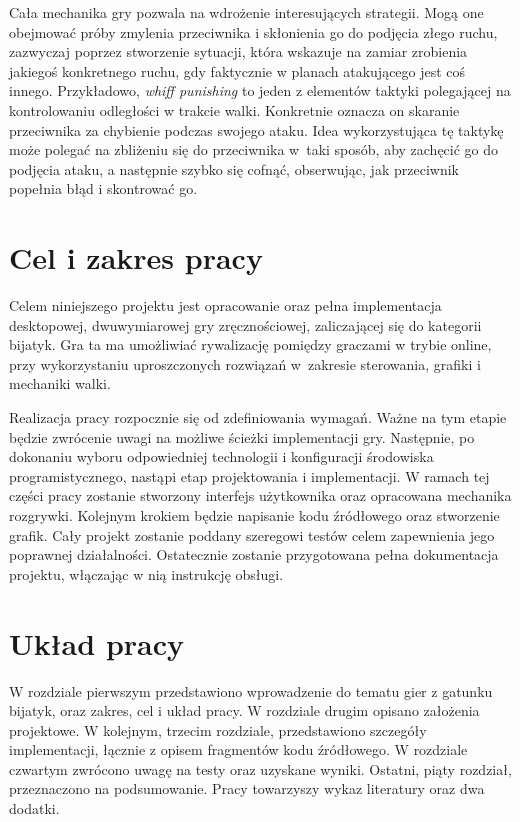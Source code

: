 Cała mechanika gry pozwala na wdrożenie interesujących strategii. Mogą one obejmować próby zmylenia przeciwnika i skłonienia go do podjęcia złego ruchu, zazwyczaj poprzez stworzenie sytuacji, która wskazuje na zamiar zrobienia jakiegoś konkretnego ruchu, gdy faktycznie w planach atakującego jest coś innego. Przykładowo, \emph{whiff punishing} to jeden z elementów taktyki polegającej na kontrolowaniu odległości w trakcie walki. Konkretnie oznacza on skaranie przeciwnika za chybienie podczas swojego ataku. Idea wykorzystująca tę taktykę może polegać na zbliżeniu się do przeciwnika w~taki sposób, aby zachęcić go do podjęcia ataku, a następnie szybko się cofnąć, obserwując, jak przeciwnik popełnia błąd i skontrować go. 


\section{Cel i zakres pracy}
Celem niniejszego projektu jest opracowanie oraz pełna implementacja desktopowej, dwuwymiarowej gry zręcznościowej, zaliczającej się do kategorii bijatyk. Gra ta ma umożliwiać rywalizację pomiędzy graczami w trybie online, przy wykorzystaniu uproszczonych rozwiązań w~zakresie sterowania, grafiki i mechaniki walki.

Realizacja pracy rozpocznie się od zdefiniowania wymagań. Ważne na tym etapie będzie zwrócenie uwagi na możliwe ścieżki implementacji gry. Następnie, po dokonaniu wyboru odpowiedniej technologii i konfiguracji środowiska programistycznego, nastąpi etap projektowania i implementacji. W ramach tej części pracy zostanie stworzony interfejs użytkownika oraz opracowana mechanika rozgrywki. Kolejnym krokiem będzie napisanie kodu źródłowego oraz stworzenie grafik. Cały projekt zostanie poddany szeregowi testów celem zapewnienia jego poprawnej działalności. Ostatecznie zostanie przygotowana pełna dokumentacja projektu, włączając w nią instrukcję obsługi.

\section{Układ pracy}
W rozdziale pierwszym przedstawiono wprowadzenie do tematu gier z gatunku bijatyk, oraz zakres, cel i układ pracy.
W rozdziale drugim opisano założenia projektowe.
W kolejnym, trzecim rozdziale, przedstawiono szczegóły implementacji, łącznie z opisem fragmentów kodu źródłowego.
W rozdziale czwartym zwrócono uwagę na testy oraz uzyskane wyniki.
Ostatni, piąty rozdział, przeznaczono na podsumowanie.
Pracy towarzyszy wykaz literatury oraz dwa dodatki. 

